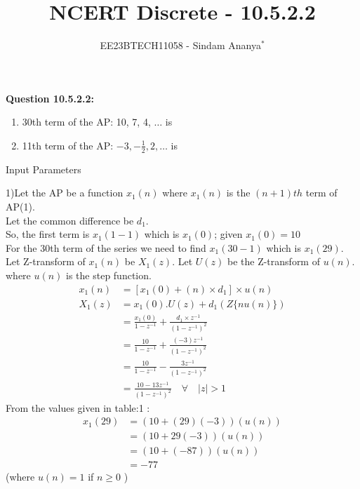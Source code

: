 \documentclass[journal,12pt,twocolumn]{IEEEtran}
\theoremstyle{remark}
\begin{document}

\vspace{3cm}

\title{NCERT Discrete - 10.5.2.2}
\author{EE23BTECH11058 - Sindam Ananya$^{*}$%
}
\maketitle
\newpage
\bigskip

\renewcommand{\thefigure}{\theenumi}
\renewcommand{\thetable}{\theenumi}

\vspace{3cm}
\textbf{Question 10.5.2.2:} 
\begin{enumerate}
\item 30th term of the AP: 10, 7, 4, $\ldots$ is 
\item 11th term of the AP: $-3, -\frac{1}{2}, 2, \ldots$ is
\end{enumerate}
\solution
\begin{table}[h!]
    \centering
    
    \caption{Input Parameters}
    \label{table:1}
    \end{table}
1)Let the AP be a function $x_1(n)$ where $x_1(n)$ is the $(n+1)th$ term of AP(1).\\
Let the common difference be $d_1$.\\
So, the first term is $x_1(1-1)$ which is $x_1(0)$; given $x_1(0) = 10$\\ 
For the 30th term of the series we need to find $x_1(30-1)$ which is $x_1(29)$.\\
Let Z-transform of $x_1(n)$ be $X_1(z)$. Let $U(z)$ be the Z-transform of $u(n)$.\\
where \(u(n)\) is the step function.
\begin{align}
x_1(n) &= [x_1(0) + (n) \times d_1 ]\times u(n)\\
X_1(z) &= x_1(0).U(z) + d_1(Z\{nu(n)\})\\
       &= \frac{x_1(0)}{1-z^{-1}} + \frac{d_1\times z^{-1}}{(1-z^{-1})^2}\\
       &= \frac{10}{1-z^{-1}} + \frac{(-3)z^{-1}}{(1-z^{-1})^2}\\
       &= \frac{10}{1-z^{-1}} - \frac{3z^{-1}}{(1-z^{-1})^2}\\
       &= \frac{10 - 13z^{-1}}{(1-z^{-1})^2} \quad \forall \quad |z| > 1
\end{align}
From the values given in table:1 :
\begin{align}
x_1(29) &= (10 + (29)(-3))(u(n))\\
&= (10 + 29(-3))(u(n))\\
&= (10+ (-87))(u(n))  \\
&= -77
\end{align}
(where $u(n) = 1$ if $n \geq 0$ )\\
                 
\end{document}
